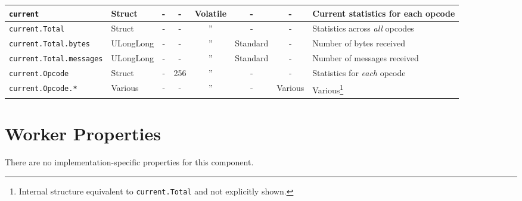 \documentclass{article}
\begin{document}
\begin{landscape}
\begin{scriptsize}
\begin{minipage}{\textwidth}
\begin{tabular}{|p{3cm}|p{1.5cm}|c|c|c|c|c|p{7cm}|}
				\hline
				\verb+current+                & Struct    & -                       & -               & Volatile          & -            & -       & Current statistics for each opcode                                                                                                                                                \\
				\hline
				\verb+current.Total+          & Struct    & -                       & -               & ''                 & -            & -       & Statistics across \textit{all} opcodes                                                                                                                                            \\
				\hline
				\verb+current.Total.bytes+    & ULongLong & -                       & -               & ''                 & Standard     & -       & Number of bytes received                                                                                                                                                          \\
				\hline
				\verb+current.Total.messages+ & ULongLong & -                       & -               & ''                 & Standard     & -       & Number of messages received                                                                                                                                                       \\
				\hline
				\verb+current.Opcode+         & Struct    & -                       & 256             & ''                 & -            & -       & Statistics for \textit{each} opcode                                                                                                                                               \\
				\hline
				\verb+current.Opcode.*+       & Various   & -                       & -               & ''                 & -            & Various & Various\footnote{Internal structure equivalent to \texttt{current.Total} and not explicitly shown.}                                                                               \\
				\hline
			\end{tabular}
		\end{minipage}
	\end{scriptsize}
	\section*{Worker Properties}
	There are no implementation-specific properties for this component.


\end{landscape}
\end{document}
